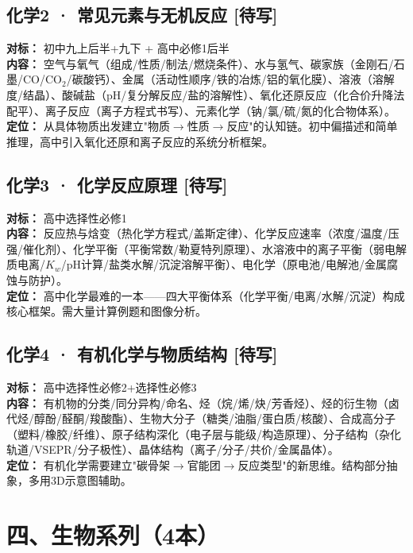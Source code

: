\documentclass[a4paper,12pt]{ctexart}
\newcommand{\plan}{\textcolor{planblue}{\textbf{[待写]}}}
\begin{document}
\subsection*{化学2 · 常见元素与无机反应 \plan}

\textbf{对标：} 初中九上后半+九下 + 高中必修1后半\\
\textbf{内容：} 空气与氧气（组成/性质/制法/燃烧条件）、水与氢气、碳家族（金刚石/石墨/CO/CO$_2$/碳酸钙）、金属（活动性顺序/铁的冶炼/铝的氧化膜）、溶液（溶解度/结晶）、酸碱盐（pH/复分解反应/盐的溶解性）、氧化还原反应（化合价升降法配平）、离子反应（离子方程式书写）、元素化学（钠/氯/硫/氮的化合物体系）。\\
\textbf{定位：} 从具体物质出发建立"物质$\rightarrow$性质$\rightarrow$反应"的认知链。初中偏描述和简单推理，高中引入氧化还原和离子反应的系统分析框架。

\subsection*{化学3 · 化学反应原理 \plan}

\textbf{对标：} 高中选择性必修1\\
\textbf{内容：} 反应热与焓变（热化学方程式/盖斯定律）、化学反应速率（浓度/温度/压强/催化剂）、化学平衡（平衡常数/勒夏特列原理）、水溶液中的离子平衡（弱电解质电离/$K_w$/pH计算/盐类水解/沉淀溶解平衡）、电化学（原电池/电解池/金属腐蚀与防护）。\\
\textbf{定位：} 高中化学最难的一本——四大平衡体系（化学平衡/电离/水解/沉淀）构成核心框架。需大量计算例题和图像分析。

\subsection*{化学4 · 有机化学与物质结构 \plan}

\textbf{对标：} 高中选择性必修2+选择性必修3\\
\textbf{内容：} 有机物的分类/同分异构/命名、烃（烷/烯/炔/芳香烃）、烃的衍生物（卤代烃/醇酚/醛酮/羧酸酯）、生物大分子（糖类/油脂/蛋白质/核酸）、合成高分子（塑料/橡胶/纤维）、原子结构深化（电子层与能级/构造原理）、分子结构（杂化轨道/VSEPR/分子极性）、晶体结构（离子/分子/共价/金属晶体）。\\
\textbf{定位：} 有机化学需要建立"碳骨架$\rightarrow$官能团$\rightarrow$反应类型"的新思维。结构部分抽象，多用3D示意图辅助。

\newpage

\section*{\textcolor{orange!80!black}{四、生物系列（4本）}}
\end{document}
